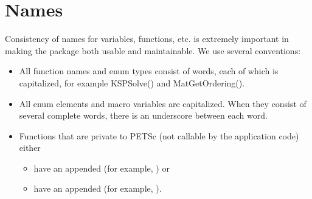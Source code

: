 \documentclass[twoside,12pt]{../sty/report_petsc}
\begin{document}
\section{Names}
Consistency of names for variables, functions, etc. is extremely
important in making the package both usable and maintainable.
We use several conventions:
\begin{itemize}
\item All function names and enum types consist of words, each of
      which is capitalized, for example KSPSolve() and
      MatGetOrdering().
\item All enum elements and macro variables are capitalized. When
      they consist of several complete words, there is an underscore between each word.
\item Functions that are private to PETSc (not callable by the
      application code) either
      \begin{itemize}
        \item have an appended  (for example,
           ) or
        \item have an appended  (for example,
           ).
      \end{itemize}


\end{itemize}
\end{document}
